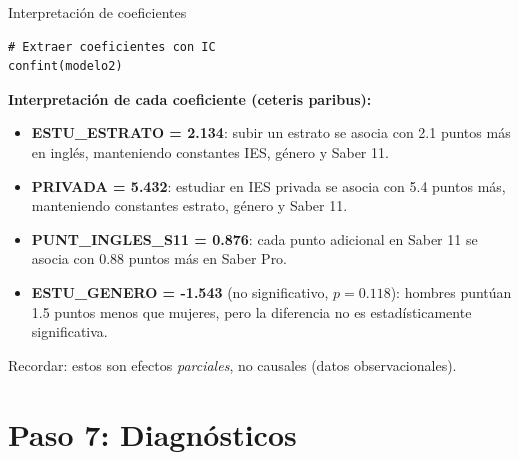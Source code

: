 \documentclass[aspectratio=169, 11pt]{beamer}
\begin{document}
\begin{frame}[fragile]{Interpretación de coeficientes}
\begin{lstlisting}
# Extraer coeficientes con IC
confint(modelo2)
\end{lstlisting}

\vspace{0.3cm}
\textbf{Interpretación de cada coeficiente (ceteris paribus):}
\begin{itemize}
\item \textbf{ESTU\_ESTRATO = 2.134}: subir un estrato se asocia con 2.1 puntos más en inglés, manteniendo constantes IES, género y Saber 11.
\item \textbf{PRIVADA = 5.432}: estudiar en IES privada se asocia con 5.4 puntos más, manteniendo constantes estrato, género y Saber 11.
\item \textbf{PUNT\_INGLES\_S11 = 0.876}: cada punto adicional en Saber 11 se asocia con 0.88 puntos más en Saber Pro.
\item \textbf{ESTU\_GENERO = -1.543} (no significativo, $p = 0.118$): hombres puntúan 1.5 puntos menos que mujeres, pero la diferencia no es estadísticamente significativa.
\end{itemize}

\vspace{0.3cm}
\small
\textcolor{javeriana}{Recordar}: estos son efectos \textit{parciales}, no causales (datos observacionales).
\end{frame}

\section{Paso 7: Diagnósticos}
\end{document}
